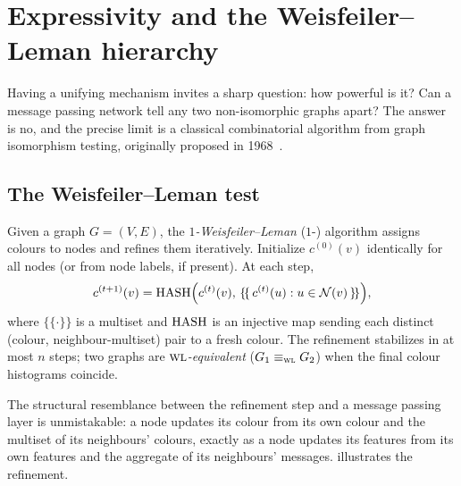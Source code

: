 \section{Expressivity and the Weisfeiler--Leman hierarchy}
\label{sec:graphs:wl}

Having a unifying mechanism invites a sharp question: how powerful is it? Can a
message passing network tell any two non-isomorphic graphs apart? The answer is
no, and the precise limit is a classical combinatorial algorithm from graph
isomorphism testing, originally proposed in 1968~\citep{weisfeiler1968reduction}.

\subsection{The Weisfeiler--Leman test}
\label{sec:graphs:wl-test}

\begin{definition}
\label{def:graphs:wl}
Given a graph $G = (V, E)$, the \emph{$1$-Weisfeiler--Leman} ($1$-\WL) algorithm
assigns colours to nodes and refines them iteratively. Initialize $c^{(0)}(v)$
identically for all nodes (or from node labels, if present). At each step,
\[
  c^{(t+1)}(v) = \operatorname{HASH}\!\Big(c^{(t)}(v),\,
      \{\!\{\, c^{(t)}(u) : u \in \mathcal{N}(v) \,\}\!\}\Big),
\]
where $\{\!\{\cdot\}\!\}$ is a multiset and $\operatorname{HASH}$ is an injective map sending
each distinct (colour, neighbour-multiset) pair to a fresh colour. The refinement
stabilizes in at most $n$ steps; two graphs are \emph{$\textsc{wl}$-equivalent}
($G_1 \equiv_{\textsc{wl}} G_2$) when the final colour histograms coincide.
\end{definition}

The structural resemblance between the refinement step and a message passing
layer is unmistakable: a node updates its colour from its own colour and the
multiset of its neighbours' colours, exactly as a node updates its features from
its own features and the aggregate of its neighbours' messages.
 illustrates the refinement.

